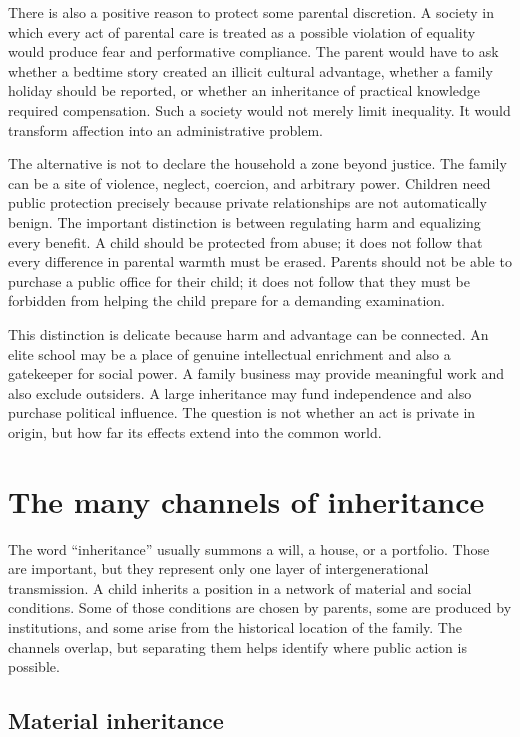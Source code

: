 ﻿\documentclass[12pt,a4paper]{book}
\begin{document}
There is also a positive reason to protect some parental discretion.  A
society in which every act of parental care is treated as a possible
violation of equality would produce fear and performative compliance.  The
parent would have to ask whether a bedtime story created an illicit cultural
advantage, whether a family holiday should be reported, or whether an
inheritance of practical knowledge required compensation.  Such a society
would not merely limit inequality.  It would transform affection into an
administrative problem.

The alternative is not to declare the household a zone beyond justice.  The
family can be a site of violence, neglect, coercion, and arbitrary power.
Children need public protection precisely because private relationships are
not automatically benign.  The important distinction is between regulating
harm and equalizing every benefit.  A child should be protected from abuse;
it does not follow that every difference in parental warmth must be erased.
Parents should not be able to purchase a public office for their child; it
does not follow that they must be forbidden from helping the child prepare
for a demanding examination.

This distinction is delicate because harm and advantage can be connected.
An elite school may be a place of genuine intellectual enrichment and also a
gatekeeper for social power.  A family business may provide meaningful work
and also exclude outsiders.  A large inheritance may fund independence and
also purchase political influence.  The question is not whether an act is
private in origin, but how far its effects extend into the common world.

\section{The many channels of inheritance}

The word ``inheritance'' usually summons a will, a house, or a portfolio.
Those are important, but they represent only one layer of intergenerational
transmission.  A child inherits a position in a network of material and
social conditions.  Some of those conditions are chosen by parents, some
are produced by institutions, and some arise from the historical location
of the family.  The channels overlap, but separating them helps identify
where public action is possible.

\subsection{Material inheritance}
\end{document}
